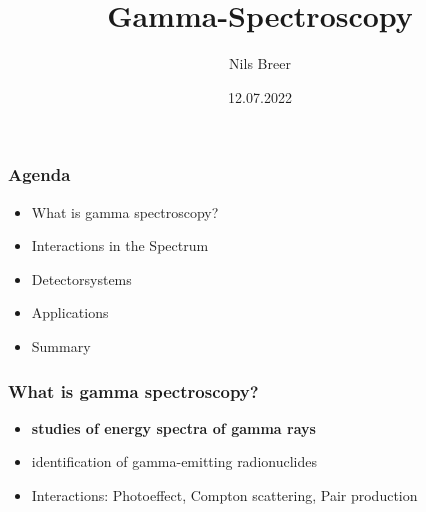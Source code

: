 \documentclass[aspectratio=1610, 9pt]{beamer}
\title{Gamma-Spectroscopy}
\author[N.Breer]{Nils Breer}
\institute{Fakultät Physik}
\date{12.07.2022}
\begin{document}
\maketitle

\begin{frame}\frametitle{Agenda}
  \begin{itemize}
    \item What is gamma spectroscopy?
    \item Interactions in the Spectrum
    \item Detectorsystems
    \item Applications
    \item Summary
  \end{itemize}
\end{frame}

\begin{frame}\frametitle{What is gamma spectroscopy?}
  \begin{itemize}
    \item \textbf{studies of energy spectra of gamma rays}
    \item identification of gamma-emitting radionuclides
    \item Interactions: Photoeffect, Compton scattering, Pair production
  \end{itemize}
\end{frame}
\end{document}
